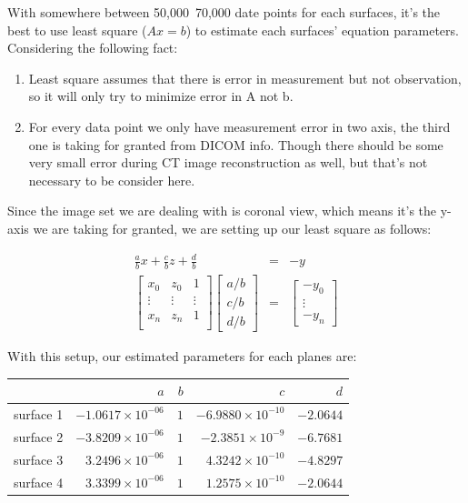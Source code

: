 With somewhere between 50,000~70,000 date points for each surfaces, it's the best to use least square ($Ax=b$) to 
estimate each surfaces' equation parameters. Considering the following fact:
\begin{enumerate}
  \item Least square assumes that there is error in measurement but not observation, so it will only try to
    minimize error in A not b.
  \item For every data point we only have measurement error in two axis, the third one is taking for granted 
    from DICOM info. Though there should be some very small error during CT image reconstruction as well, but
    that's not necessary to be consider here.
\end{enumerate}
Since the image set we are dealing with is coronal view, which means it's the y-axis we are taking for granted,
we are setting up our least square as follows:

\begin{eqnarray}
\frac{a}{b}x + \frac{c}{b}z + \frac{d}{b} & = & -y \label{eq:x_orient}\\
\begin{bmatrix}
  x_0  & z_0 & 1 \\
  \vdots & \vdots & \vdots \\
  x_n & z_n & 1 \\
\end{bmatrix}
\begin{bmatrix}
a/b\\
c/b\\
d/b
\end{bmatrix}
& = &
\begin{bmatrix}
-y_0 \\
\vdots\\
-y_n
\end{bmatrix}
\end{eqnarray}

With this setup, our estimated parameters for each planes are:

\begin{tabular}{| l || r | r | r | r |}
            \hline
            &               $a$ & $b$ &               $c$ & $d$ \\
            \hline
  surface 1 & $-1.0617\times10^{-06}$ & $1$ & $-6.9880\times10^{-10}$ & $-2.0644$ \\ 
            \hline
  surface 2 & $-3.8209\times10^{-06}$ & $1$ & $-2.3851\times10^{-9}$  & $-6.7681$ \\ 
            \hline
  surface 3 & $3.2496\times10^{-06}$  & $1$ & $4.3242\times10^{-10}$  & $-4.8297$ \\ 
            \hline
  surface 4 & $3.3399\times10^{-06}$  & $1$ & $1.2575\times10^{-10}$  & $-2.0644$ \\ 
            \hline
\end{tabular}

